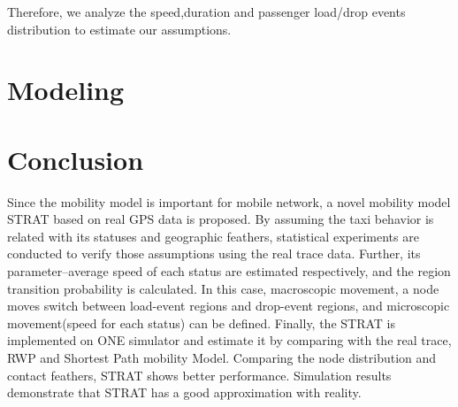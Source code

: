 \documentclass[camera-ready,twocolumn,10pt]{IEEEtran}
\begin{document}
   Therefore, we analyze the speed,duration and passenger load/drop events distribution to estimate our assumptions.








\section{Modeling}
\label{section_modeling}








\section{Conclusion}
\label{section_conclusion}
Since the mobility model is important for mobile network, a novel mobility model STRAT based on real GPS data is proposed. By assuming the taxi behavior is related with its statuses and geographic feathers, statistical experiments are conducted to verify those assumptions using the real trace data. Further, its parameter--average speed of each status are estimated respectively, and the region transition probability is calculated. In this case, macroscopic movement, a node moves switch between load-event regions and drop-event regions, and microscopic movement(speed for each status) can be defined. Finally, the STRAT is implemented on ONE simulator and estimate it by comparing with the real trace, RWP and Shortest Path mobility Model.
Comparing the node distribution and contact feathers, STRAT shows better performance.
Simulation results demonstrate that STRAT has a good approximation with reality.






\end{document}
